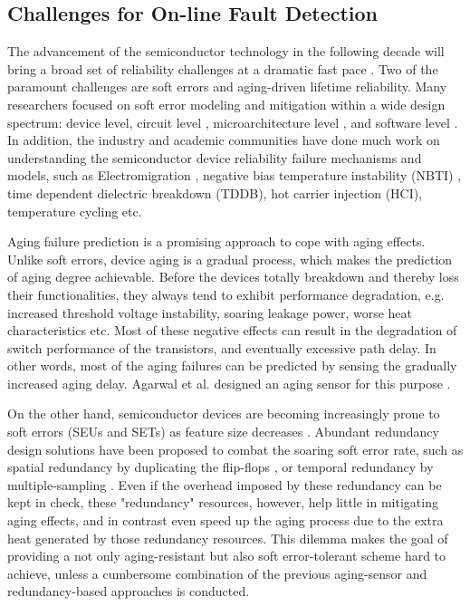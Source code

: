 \subsection{Challenges for On-line Fault Detection}

The advancement of the semiconductor technology in the following decade will bring a broad set of reliability challenges at a dramatic fast pace \cite{sematech03}. Two of the paramount challenges are soft errors and aging-driven lifetime reliability. Many researchers focused on soft error modeling and mitigation within a wide design spectrum: device level, circuit level \cite{Mitra_C05}\cite{Han_DT05}\cite{Zhang_TVLSI06}, microarchitecture level \cite{Vijaykumar_ISCA02}, and software level \cite{Oh_TR02}. In addition, the industry and academic communities have done much work on understanding the semiconductor device reliability failure mechanisms and models, such as Electromigration \cite{Electromigration_69}, negative bias temperature instability (NBTI) \cite{NBTI_Impact05}\cite{Modeling-and-minimization_06}\cite{wang2007impact}, time dependent dielectric breakdown (TDDB), hot carrier injection (HCI), temperature cycling \cite{failure_models_00} etc.

Aging failure prediction \cite{agarwal2007circuit} \cite{failure_prediction2_08} is a promising approach to cope with aging effects. Unlike soft errors, device aging is a gradual process, which makes the prediction of aging degree achievable. Before the devices totally breakdown and thereby loss their functionalities, they always tend to exhibit performance degradation, e.g. increased threshold voltage instability, soaring leakage power, worse heat characteristics etc. Most of these negative effects can result in the degradation of switch performance of the transistors\cite{degradation_05}, and eventually excessive path delay. In other words, most of the aging failures can be predicted by sensing the gradually increased aging delay. Agarwal et al. designed an aging sensor for this purpose \cite{agarwal2007circuit}.

On the other hand, semiconductor devices are becoming increasingly prone to soft errors (SEUs and SETs) as feature size decreases \cite{Shivakumar_DSN02}. Abundant redundancy design solutions have been proposed to combat the soaring soft error rate, such as spatial redundancy by duplicating the flip-flops \cite{Mitra_C05} \cite{lowcost_date07}, or temporal redundancy by multiple-sampling \cite{Nicolaidis_VTS99}. Even if the overhead imposed by these redundancy can be kept in check, these "redundancy" resources, however, help little in mitigating aging effects, and in contrast even speed up the aging process due to the extra heat generated by those redundancy resources. This dilemma makes the goal of providing a not only aging-resistant but also soft error-tolerant scheme hard to achieve, unless a cumbersome combination of the previous aging-sensor and redundancy-based approaches is conducted.

